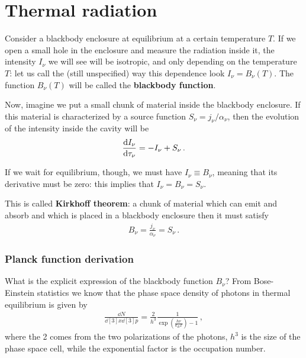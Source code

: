 \documentclass[main.tex]{subfiles}
\begin{document}
\section{Thermal radiation}


Consider a blackbody enclosure at equilibrium at a certain temperature \(T\). If we open a small hole in the enclosure and measure the radiation inside it, the intensity \(I_\nu \) we will see will be isotropic, and only depending on the temperature \(T\): let us call the (still unspecified) way this dependence look \(I_\nu = B_\nu (T)\). The function \(B_\nu (T)\) will be called the \textbf{blackbody function}. 

Now, imagine we put a small chunk of material inside the blackbody enclosure. If this material is characterized by a source function \(S_\nu = j_\nu / \alpha_{\nu }\), then the evolution of the intensity inside the cavity will be 
%
\begin{align}
\dv{I_\nu }{\tau_{\nu }} = - I_\nu + S_\nu 
\,.
\end{align}

If we wait for equilibrium, though, we must have \(I_\nu \equiv B_\nu \), meaning that its derivative must be zero: this implies that \(I_\nu = B_\nu = S_\nu \). 

This is called \textbf{Kirkhoff theorem}: a chunk of material which can emit and absorb and which is placed in a blackbody enclosure then it must satisfy 
%
\begin{align}
B_\nu = \frac{j_\nu}{\alpha_{\nu }} = S_\nu 
\,.
\end{align}

\subsubsection{Planck function derivation}

What is the explicit expression of the blackbody function \(B_\nu \)? 
From Bose-Einstein statistics we know that the phase space density of photons in thermal equilibrium is given by 
%
\begin{align}
\frac{ \dd{N}}{ \dd[3]{x} \dd[3]{p}} = \frac{2}{h^3} \frac{1}{\exp( \frac{h \nu }{k_B T}) - 1}
\,,
\end{align}
%
where the 2 comes from the two polarizations of the photons, \(h^3\) is the size of the phase space cell, while the exponential factor is the occupation number. 
\end{document}
